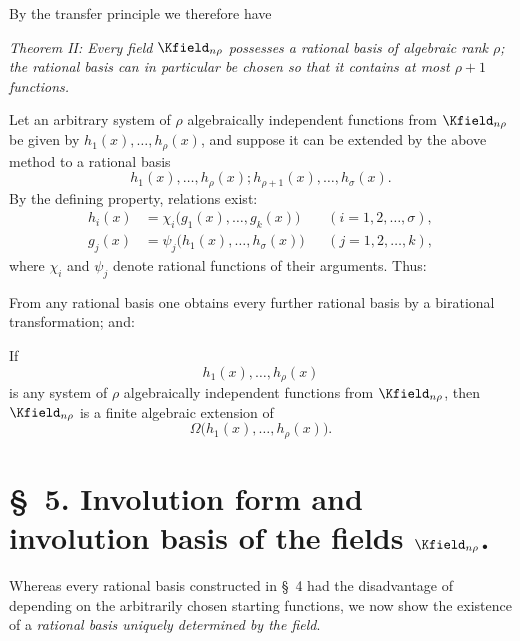 \documentclass[11pt]{article}
\begin{document}
By the transfer principle we therefore have

\emph{Theorem II: Every field $\Kfield_{n\rho}$ possesses a rational basis of algebraic rank $\rho$; the rational basis can in particular be chosen so that it contains at most $\rho+1$ functions.}

Let an arbitrary system of $\rho$ algebraically independent functions from $\Kfield_{n\rho}$ be given by $h_1(x),\ldots,h_\rho(x)$, and suppose it can be extended by the above method to a rational basis
\[
  h_1(x),\ldots,h_\rho(x);
  h_{\rho+1}(x),\ldots,h_\sigma(x).
\]
By the defining property, relations exist:
\[
\begin{aligned}
  h_i(x)&=\chi_i\bigl(g_1(x),\ldots,g_k(x)\bigr)
    &&(i=1,2,\ldots,\sigma),\\
  g_j(x)&=\psi_j\bigl(h_1(x),\ldots,h_\sigma(x)\bigr)
    &&(j=1,2,\ldots,k),
\end{aligned}
\]
where $\chi_i$ and $\psi_j$ denote rational functions of their arguments. Thus:

From any rational basis one obtains every further rational basis by a birational transformation; and:

If
\[
  h_1(x),\ldots,h_\rho(x)
\]
is any system of $\rho$ algebraically independent functions from $\Kfield_{n\rho}$, then $\Kfield_{n\rho}$ is a finite algebraic extension of
\[
  \Omega\bigl(h_1(x),\ldots,h_\rho(x)\bigr).
\]

\section*{\S\ 5. Involution form and involution basis of the fields $\Kfield_{n\rho}$.}

Whereas every rational basis constructed in \S\ 4 had the disadvantage of depending on the arbitrarily chosen starting functions, we now show the existence of a \emph{rational basis uniquely determined by the field}.
\end{document}
